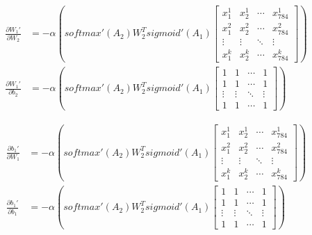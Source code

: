 \documentclass[12pt,a4paper]{amsart}
\begin{document}
\begin{equation}
	\begin{aligned}
		\frac{\partial {W_1}'}{\partial W_2} & = - \alpha \left( softmax'(A_2) W_2^T sigmoid'(A_1) \begin{bmatrix}
			x_1^1  & x_2^1  & \cdots & x_{784}^1 \\
			x_1^2  & x_2^2  & \cdots & x_{784}^2 \\
			\vdots & \vdots & \ddots & \vdots    \\
			x_1^k  & x_2^k  & \cdots & x_{784}^k
		\end{bmatrix} \right) \\
		\frac{\partial {W_1}'}{\partial b_2} & = - \alpha \left( softmax'(A_2) W_2^T sigmoid'(A_1) \begin{bmatrix}
			1      & 1      & \cdots & 1      \\
			1      & 1      & \cdots & 1      \\
			\vdots & \vdots & \ddots & \vdots \\
			1      & 1      & \cdots & 1
		\end{bmatrix} \right)
	\end{aligned}
\end{equation}

\begin{equation}
	\begin{aligned}
		\frac{\partial {b_1}'}{\partial W_1} & = - \alpha \left( softmax'(A_2) W_2^T sigmoid'(A_1) \begin{bmatrix}
			x_1^1  & x_2^1  & \cdots & x_{784}^1 \\
			x_1^2  & x_2^2  & \cdots & x_{784}^2 \\
			\vdots & \vdots & \ddots & \vdots    \\
			x_1^k  & x_2^k  & \cdots & x_{784}^k
		\end{bmatrix} \right) \\
		\frac{\partial {b_1}'}{\partial b_1} & = - \alpha \left( softmax'(A_2) W_2^T sigmoid'(A_1) \begin{bmatrix}
			1      & 1      & \cdots & 1      \\
			1      & 1      & \cdots & 1      \\
			\vdots & \vdots & \ddots & \vdots \\
			1      & 1      & \cdots & 1
		\end{bmatrix} \right)
	\end{aligned}
\end{equation}
\end{document}

